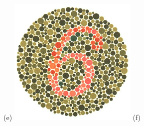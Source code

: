 \documentclass[	12pt, Times, openright, twoside, a4paper, english, brazil]{abntex2}
\begin{document}
\begin{apendicesenv}
\begin{figure}[!htb]
(e)
\endminipage\hfill
{}
\centering
{\includegraphics[width=\linewidth]{ishihara-transformacao/plate3.png}}
(f)
\endminipage\hfill


\end{figure}
\end{apendicesenv}
\end{document}

